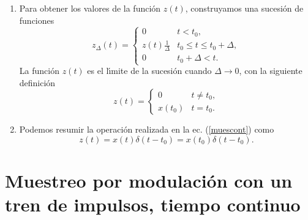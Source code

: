 \begin{enumerate}
\item Para obtener los valores de la funci\'{o}n $z(t)$, construyamos una sucesi\'{o}n de funciones
                \begin{equation}
                        z_{\Delta} \left( t \right) = \left \{
                        \begin{array}{ll}
                 0                                       &       t < t_{0},                              \\
                 z\left( t \right) \frac{1}{\Delta}      &       t_{0} \leq t \leq t_{0} + \Delta,       \\
                 0                                       &       t_{0} + \Delta < t.
                        \end{array}
                        \right.
                \end{equation}
                La funci\'{o}n $z \left( t \right)$ es el l\'{\i}mite de la sucesi\'{o}n cuando
                $\Delta \rightarrow 0$, con la siguiente definici\'{o}n
                \begin{equation}
                        z\left(t \right) = \left \{
                        \begin{array}{ll}
                                0                       &       t \neq t_{0},   \\
                                x\left(t_{0}\right)     &       t  = t_{0}.
                        \end{array}             \label{muescont}
                        \right.
                \end{equation}

\item   Podemos resumir la operaci\'{o}n realizada en la ec. (\ref{muescont}) como              
                \begin{equation}
                        z \left( t \right) = 
                                x\left( t\right) \delta \left( t-t_{0}\right) =
                                x\left( t_{0}\right) \delta \left( t-t_{0}\right) .
                \end{equation}

\end{enumerate}

\section{Muestreo por modulaci\'{o}n con un tren de impulsos, tiempo continuo}


